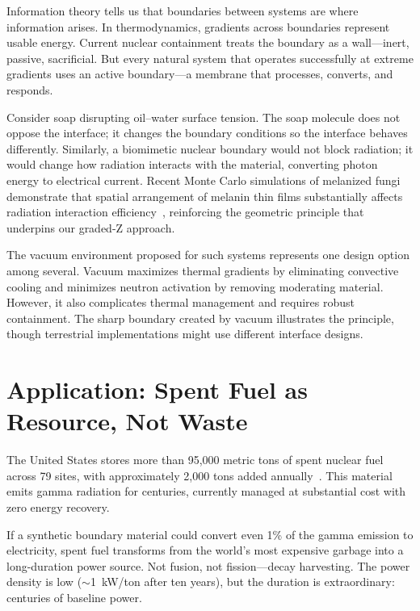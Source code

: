 \documentclass[12pt]{article}
\begin{document}
Information theory tells us that boundaries between systems are where information arises.
In thermodynamics, gradients across boundaries represent usable energy. Current nuclear
containment treats the boundary as a wall---inert, passive, sacrificial. But every
natural system that operates successfully at extreme gradients uses an active
boundary---a membrane that processes, converts, and responds.

Consider soap disrupting oil--water surface tension. The soap molecule does not oppose
the interface; it changes the boundary conditions so the interface behaves differently.
Similarly, a biomimetic nuclear boundary would not block radiation; it would change how
radiation interacts with the material, converting photon energy to electrical current.
Recent Monte Carlo simulations of melanized fungi demonstrate that spatial arrangement
of melanin thin films substantially affects radiation interaction efficiency~\cite{vasileiou2020},
reinforcing the geometric principle that underpins our graded-Z approach.

The vacuum environment proposed for such systems represents one design option among
several. Vacuum maximizes thermal gradients by eliminating convective cooling and
minimizes neutron activation by removing moderating material. However, it also
complicates thermal management and requires robust containment. The sharp boundary
created by vacuum illustrates the principle, though terrestrial implementations might
use different interface designs.

\section{Application: Spent Fuel as Resource, Not Waste}

The United States stores more than 95{,}000 metric tons of spent nuclear fuel across 79
sites, with approximately 2{,}000 tons added annually~\cite{doe2025}. This material emits
gamma radiation for centuries, currently managed at substantial cost with zero energy
recovery.

If a synthetic boundary material could convert even 1\% of the gamma emission to
electricity, spent fuel transforms from the world's most expensive garbage into a
long-duration power source. Not fusion, not fission---decay harvesting. The power density
is low ($\sim$1~kW/ton after ten years), but the duration is extraordinary: centuries of
baseline power.
\end{document}
